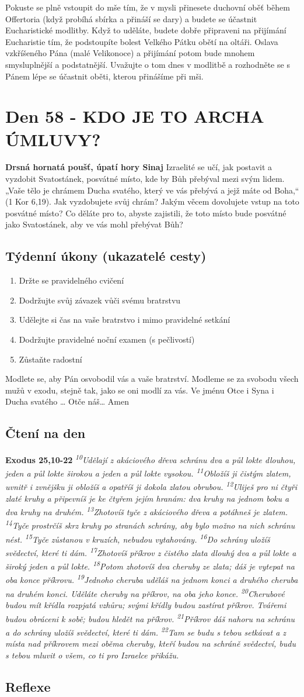 \documentclass[11pt]{article}
\newcommand{\zacatekDevatyTyden}{
\textbf{Drsná hornatá poušť, úpatí hory Sinaj} \newline 
Izraelité se učí, jak postavit a vyzdobit Svatostánek, posvátné místo, kde by Bůh přebýval mezi svým lidem. „Vaše tělo je chrámem Ducha svatého, který ve vás přebývá a jejž máte od Boha,“ (1 Kor 6,19). Jak vyzdobujete svůj chrám? Jakým věcem dovolujete vstup na toto posvátné místo? Co děláte pro to, abyste zajistili, že toto místo bude posvátné jako Svatostánek, aby ve vás mohl přebývat Bůh?

\subsection*{Týdenní úkony (ukazatelé cesty)}
\begin{enumerate}
  \item Držte se pravidelného cvičení
  \item Dodržujte svůj závazek vůči svému bratrstvu
  \item Udělejte si čas na vaše bratrstvo i mimo pravidelné setkání
  \item Dodržujte pravidelné noční examen (s pečlivostí)
  \item Zůstaňte radostní
\end{enumerate}
Modlete se, aby Pán osvobodil vás a vaše bratrství. \newline
Modleme se za svobodu všech mužů v exodu, stejně tak, jako se oni modlí za vás.\newline
Ve jménu Otce i Syna i Ducha svatého …  Otče náš… Amen
}
\begin{document}
Pokuste se plně vstoupit do mše tím, že v mysli přinesete duchovní oběť během Offertoria (když probíhá sbírka a přináší se dary) a
budete se účastnit Eucharistické modlitby. Když to uděláte, budete dobře připraveni na přijímání Eucharistie tím, že podstoupíte
bolest Velkého Pátku obětí na oltáři. Oslava vzkříšeného Pána (malé Velikonoce) a přijímání potom bude mnohem smysluplnější a
podstatnější. Uvažujte o tom dnes v modlitbě a rozhodněte se s Pánem lépe se účastnit oběti, kterou přinášíme při mši.


\newpage
\section{Den 58 - KDO JE TO ARCHA ÚMLUVY?}
\zacatekDevatyTyden
\subsection*{Čtení na den}
\textbf{Exodus 25,10-22}
\newline
\textit{
\textsuperscript{10}Udělají z akáciového dřeva schránu dva a půl lokte dlouhou, jeden a půl lokte širokou a jeden a půl lokte vysokou.
\textsuperscript{11}Obložíš ji čistým zlatem, uvnitř i zvnějšku ji obložíš a opatříš ji dokola zlatou obrubou.
\textsuperscript{12}Uliješ pro ni čtyři zlaté kruhy a připevníš je ke čtyřem jejím hranám: dva kruhy na jednom boku a dva kruhy na druhém.
\textsuperscript{13}Zhotovíš tyče z akáciového dřeva a potáhneš je zlatem.
\textsuperscript{14}Tyče prostrčíš skrz kruhy po stranách schrány, aby bylo možno na nich schránu nést.
\textsuperscript{15}Tyče zůstanou v kruzích, nebudou vytahovány.
\textsuperscript{16}Do schrány uložíš svědectví, které ti dám.
\textsuperscript{17}Zhotovíš příkrov z čistého zlata dlouhý dva a půl lokte a široký jeden a půl lokte.
\textsuperscript{18}Potom zhotovíš dva cheruby ze zlata; dáš je vytepat na oba konce příkrovu.
\textsuperscript{19}Jednoho cheruba uděláš na jednom konci a druhého cheruba na druhém konci. Uděláte cheruby na příkrov, na oba jeho konce.
\textsuperscript{20}Cherubové budou mít křídla rozpjatá vzhůru; svými křídly budou zastírat příkrov. Tvářemi budou obráceni k sobě; budou hledět na příkrov.
\textsuperscript{21}Příkrov dáš nahoru na schránu a do schrány uložíš svědectví, které ti dám.
\textsuperscript{22}Tam se budu s tebou setkávat a z místa nad příkrovem mezi oběma cheruby, kteří budou na schráně svědectví, budu s tebou mluvit o všem, co ti pro Izraelce přikážu.
}

\subsection*{Reflexe}
\end{document}
